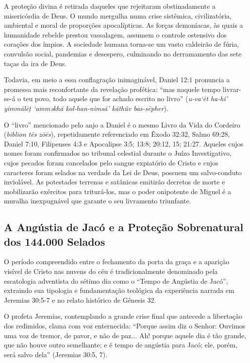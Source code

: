 A proteção divina é retirada daqueles que rejeitaram obstinadamente a misericórdia de Deus. O mundo mergulha numa crise sistêmica, civilizatória, ambiental e moral de proporções apocalípticas. As forças demoníacas, às quais a humanidade rebelde prestou vassalagem, assumem o controle ostensivo dos corações dos ímpios. A sociedade humana torna-se um vasto caldeirão de fúria, convulsão social, pandemias e desespero, culminando no derramamento das sete taças da ira de Deus.

Todavia, em meio a essa conflagração inimaginável, Daniel 12:1 pronuncia a promessa mais reconfortante da revelação profética:
``mas naquele tempo livrar-se-á o teu povo, todo aquele que for achado escrito no livro'' (\textit{u-va‘ēt ha-hî’ yimmālēṭ ‘amməkhā kol-han-nimsā’ kāthûv bas-sēpher}).

O ``livro'' mencionado pelo anjo a Daniel é o mesmo Livro da Vida do Cordeiro (\textit{biblion tēs zōēs}), repetidamente referenciado em Êxodo 32:32, Salmo 69:28, Daniel 7:10, Filipenses 4:3 e Apocalipse 3:5; 13:8; 20:12, 15; 21:27. Aqueles cujos nomes foram confirmados no tribunal celestial durante o Juízo Investigativo, cujos pecados foram cancelados pelo sangue expiatório de Cristo e cujos caracteres foram selados na verdade da Lei de Deus, possuem um salvo-conduto inviolável. As potestades terrenas e satânicas emitirão decretos de morte e mobilizarão exércitos para triturá-los, mas o poder onipotente de Miguel é a muralha inexpugnável que garante o seu livramento triunfante.



\subsection{A Angústia de Jacó e a Proteção Sobrenatural dos 144.000 Selados}


O período compreendido entre o fechamento da porta da graça e a aparição visível de Cristo nas nuvens do céu é tradicionalmente denominado pela escatologia adventista do sétimo dia como o ``Tempo de Angústia de Jacó'', extraindo sua tipologia e fundamentação teológica da experiência narrada em Jeremias 30:5-7 e no relato histórico de Gênesis 32.

O profeta Jeremias, contemplando a grande crise final que antecede a libertação dos redimidos, clama com voz enternecida:
``Porque assim diz o Senhor: Ouvimos uma voz de tremor, de pavor, e não de paz... Ah! porque aquele dia é tão grande, que não houve outro semelhante; e é tempo de angústia para Jacó; ele, porém, será salvo dela'' (Jeremias 30:5, 7).

